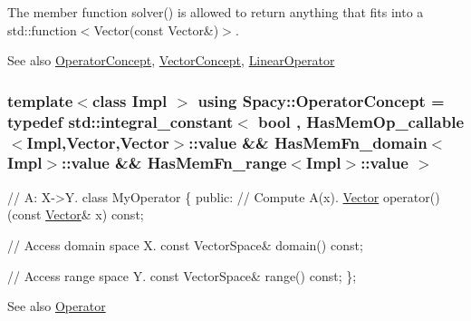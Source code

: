 The member function {\ttfamily solver()} is allowed to return anything that fits into a {\ttfamily std\+::function$<$Vector(const Vector\&)$>$}.

\begin{DoxySeeAlso}{See also}
\hyperlink{group__ConceptGroup_ga0cd6ba53feff75abbb6822b45fd6265e}{Operator\+Concept}, \hyperlink{group__ConceptGroup_gac8fbeed0f838941e90ebe635a546e1db}{Vector\+Concept}, \hyperlink{classSpacy_1_1LinearOperator}{Linear\+Operator} 
\end{DoxySeeAlso}
\hypertarget{group__ConceptGroup_ga0cd6ba53feff75abbb6822b45fd6265e}{}
\subsubsection[{Operator\+Concept}]{\setlength{\rightskip}{0pt plus 5cm}template$<$class Impl $>$ using {\bf Spacy\+::\+Operator\+Concept} = typedef std\+::integral\+\_\+constant$<$ bool , Has\+Mem\+Op\+\_\+callable$<$Impl,Vector,Vector$>$\+::value \&\& Has\+Mem\+Fn\+\_\+domain$<$Impl$>$\+::value \&\& Has\+Mem\+Fn\+\_\+range$<$Impl$>$\+::value $>$}\label{group__ConceptGroup_ga0cd6ba53feff75abbb6822b45fd6265e}
\label{group__ConceptGroup_OperatorConceptAnchor}%
\hypertarget{group__ConceptGroup_OperatorConceptAnchor}{}%
 
\begin{DoxyCode}
\textcolor{comment}{// A: X->Y.}
\textcolor{keyword}{class }MyOperator
\{
\textcolor{keyword}{public}:
  \textcolor{comment}{// Compute A(x).}
  \hyperlink{group__VectorSpaceGroup_gafda42fd5aa3f7597a42b9831bf4dfd07}{Vector} operator()(\textcolor{keyword}{const} \hyperlink{group__VectorSpaceGroup_gafda42fd5aa3f7597a42b9831bf4dfd07}{Vector}& x) \textcolor{keyword}{const};

  \textcolor{comment}{// Access domain space X.}
  \textcolor{keyword}{const} VectorSpace& domain() \textcolor{keyword}{const};

  \textcolor{comment}{// Access range space Y.}
  \textcolor{keyword}{const} VectorSpace& range() \textcolor{keyword}{const};
\};
\end{DoxyCode}
 \begin{DoxySeeAlso}{See also}
\hyperlink{classSpacy_1_1Operator}{Operator} 
\end{DoxySeeAlso}
\hypertarget{group__ConceptGroup_gac8fbeed0f838941e90ebe635a546e1db}{}
